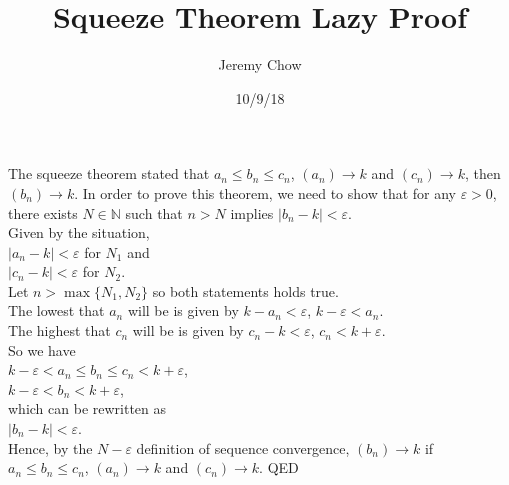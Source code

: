 \documentclass[12pt]{article}
\title{Squeeze Theorem Lazy Proof}
\author{Jeremy Chow}
\date{10/9/18}
\begin{document}
\maketitle
The squeeze theorem stated that $a_{n}\leq b_{n} \leq c_{n}$, $(a_{n})\to k  $ and $(c_{n})\to k$, then $(b_{n})\to k$. In order to prove this theorem, we need to show that for any $\varepsilon>0$, there exists $N\in \mathbb{N}$ such that $n>N$ implies $|b_{n}-k|<\varepsilon$. \\Given by the situation,\\ $|a_{n}-k|<\varepsilon$ for $N_{1}$ and\\ $|c_{n}-k|<\varepsilon$ for $N_{2}$.\\ Let $n>\max\{N_{1},N_{2}\}$ so both statements holds true.\\ The lowest that $a_{n}$ will be is given by $k-a_{n}<\varepsilon$, $k-\varepsilon<a_{n}$.\\ The highest that $c_{n}$ will be is given by $c_{n}-k<\varepsilon$, $c_{n}<k+\varepsilon$.\\ So we have\\ $k-\varepsilon<a_{n}\leq b_{n} \leq c_{n}<k+\varepsilon$,\\ $k-\varepsilon<b_{n}<k+\varepsilon$,\\ which can be rewritten as\\ $|b_{n}-k|<\varepsilon$.\\ Hence, by the $N-\varepsilon$ definition of sequence convergence, $(b_{n})\to k$ if $a_{n}\leq b_{n} \leq c_{n}$, $(a_{n})\to k  $ and $(c_{n})\to k$. QED
\end{document}
